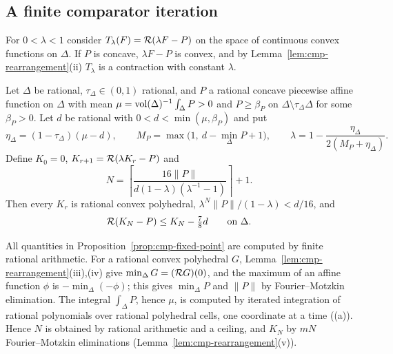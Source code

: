 \subsection{A finite comparator iteration}\label{sec:cmp-fixed}

For $0<\lambda<1$ consider $T_\lambda(F)=\mathcal{R}(\lambda F-P)$ on the space of continuous convex functions on $\Delta$.
If $P$ is concave, $\lambda F-P$ is convex, and by Lemma~\ref{lem:cmp-rearrangement}(ii) $T_\lambda$ is a
contraction with constant $\lambda$.

\begin{proposition}\label{prop:cmp-fixed-point}
Let $\Delta$ be rational, $\tau_\Delta\in(0,1)$ rational, and $P$ a rational concave piecewise affine function on
$\Delta$ with mean $\mu=\operatorname{vol}(\Delta)^{-1}\int_\Delta P>0$ and $P\ge\beta_P$ on $\Delta\setminus\tau_\Delta\Delta$ for some
$\beta_P>0$. Let $d$ be rational with $0<d<\min(\mu,\beta_P)$ and put
\[
 \eta_\Delta=(1-\tau_\Delta)(\mu-d),\qquad M_P=\max\bigl(1,\ d-\min_\Delta P+1\bigr),\qquad
 \lambda=1-\frac{\eta_\Delta}{2(M_P+\eta_\Delta)}.
\]
Define $K_0=0$, $K_{r+1}=\mathcal{R}(\lambda K_r-P)$ and
\[
 N=\left\lceil\frac{16\|P\|}{d(1-\lambda)(\lambda^{-1}-1)}\right\rceil+1.
\]
Then every $K_r$ is rational convex polyhedral, $\lambda^N\|P\|/(1-\lambda)<d/16$, and
\[
 \mathcal{R}(K_N-P)\le K_N-\tfrac78d\qquad\text{on }\Delta .
\]
\end{proposition}

All quantities in Proposition~\ref{prop:cmp-fixed-point} are computed by finite rational arithmetic. For a
rational convex polyhedral $G$, Lemma~\ref{lem:cmp-rearrangement}(iii),(iv) give $\min_\Delta G=(\mathcal{R} G)(0)$, and
the maximum of an affine function $\phi$ is $-\min_\Delta(-\phi)$; this gives $\min_\Delta P$ and $\|P\|$ by
Fourier--Motzkin elimination. The integral $\int_\Delta P$, hence $\mu$, is computed by iterated integration of
rational polynomials over rational polyhedral cells, one coordinate at a time
((a)). Hence $N$ is obtained by rational arithmetic and a ceiling, and
$K_N$ by $mN$ Fourier--Motzkin eliminations (Lemma~\ref{lem:cmp-rearrangement}(v)).

